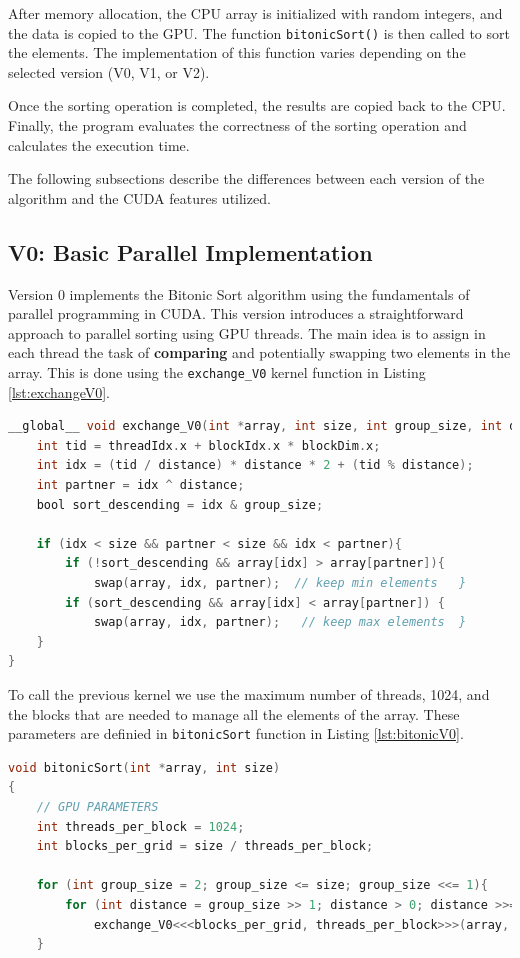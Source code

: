 \documentclass[a4paper,12pt]{article}
\begin{document}
After memory allocation, the CPU array is initialized with random integers, and the data is copied to the GPU. The function \texttt{bitonicSort()} is then called to sort the elements. The implementation of this function varies depending on the selected version (V0, V1, or V2). 

Once the sorting operation is completed, the results are copied back to the CPU. Finally, the program evaluates the correctness of the sorting operation and calculates the execution time.

The following subsections describe the differences between each version of the algorithm and the CUDA features utilized.

\subsection{V0: Basic Parallel Implementation}

Version 0 implements the Bitonic Sort algorithm using the fundamentals of parallel programming in CUDA. This version introduces a straightforward approach to parallel sorting using GPU threads.
The main idea is to assign in each thread the task of \textbf{comparing} and potentially swapping two elements in the array. This is done using the \texttt{exchange\_V0} kernel function in Listing \ref{lst:exchangeV0}.
\\
\begin{lstlisting}[language=C, caption={Exchange process using GPU's threads}, label={lst:exchangeV0}]
    __global__ void exchange_V0(int *array, int size, int group_size, int distance) {
    int tid = threadIdx.x + blockIdx.x * blockDim.x;
    int idx = (tid / distance) * distance * 2 + (tid % distance);
    int partner = idx ^ distance;
    bool sort_descending = idx & group_size;

    if (idx < size && partner < size && idx < partner){ 
        if (!sort_descending && array[idx] > array[partner]){
            swap(array, idx, partner);  // keep min elements   }
        if (sort_descending && array[idx] < array[partner]) {
            swap(array, idx, partner);   // keep max elements  }
    }
}
\end{lstlisting}
To call the previous kernel we use the maximum number of threads, 1024, and the blocks that are needed to manage all the elements of the array. These parameters are definied in \texttt{bitonicSort} function in Listing \ref{lst:bitonicV0}.
\\
\begin{lstlisting}[language=C, caption={Kernel call for elementwise comparison using threads}, label={lst:bitonicV0}]
void bitonicSort(int *array, int size)
{
    // GPU PARAMETERS
    int threads_per_block = 1024;  
    int blocks_per_grid = size / threads_per_block; 

    for (int group_size = 2; group_size <= size; group_size <<= 1){ 
        for (int distance = group_size >> 1; distance > 0; distance >>= 1)
            exchange_V0<<<blocks_per_grid, threads_per_block>>>(array, size, group_size, distance);}
    }
\end{lstlisting}
\end{document}
